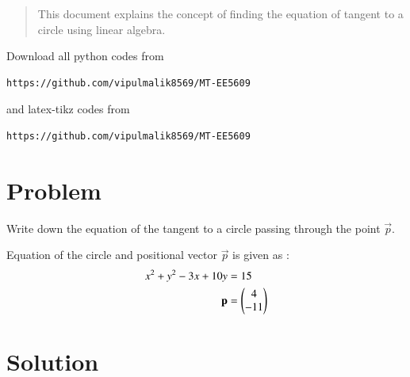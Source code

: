 \documentclass[journal,12pt,twocolumn]{IEEEtran}
\begin{document}
\date{\today}

\maketitle
\newpage
\bigskip
\renewcommand{\thefigure}{\theenumi}
\renewcommand{\thetable}{\theenumi}

\begin{abstract}
This document explains the concept of finding the equation of tangent to a circle using linear algebra.
\end{abstract}
Download all python codes from 
\begin{lstlisting}
https://github.com/vipulmalik8569/MT-EE5609
\end{lstlisting}
and latex-tikz codes from 
\begin{lstlisting}
https://github.com/vipulmalik8569/MT-EE5609
\end{lstlisting}
\section{\textbf{Problem}}
Write down the equation of the tangent to a circle passing through the point $\vec{p}$. 

Equation of the circle and positional vector $\vec{p}$ is given as :
\begin{align}
    x^2+y^2-3x+10y&=15\label{eq:0}\\
    \mathbf{p}&=\begin{pmatrix}4\\-11\end{pmatrix}
\end{align}

\section{\textbf{Solution}}
\end{document}
